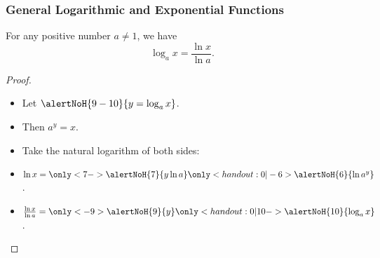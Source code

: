 \begin{frame}
\frametitle{General Logarithmic and Exponential Functions}
\begin{theorem}
For any positive number $a \neq 1$, we have
\[
\log_a x = \frac{\ln x}{\ln a} .
\]
\end{theorem}
\begin{proof}
\begin{itemize}
\item<2->  Let $\alertNoH{ 9-10}{y = \log_a x}$.
\item<3->  Then $a^y = x$.
\item<4->  Take the natural logarithm of both sides:
\item<5->  $\ln x=\only<7->{\alertNoH{ 7}{y \ln a}}\only<handout:0| -6>{\alertNoH{ 6}{\ln a^y}} $.
\item<8->  $\frac{\ln x}{\ln a}=\only<-9>{\alertNoH{ 9}{y}}\only<handout:0| 10->{\alertNoH{ 10}{\log_a x}} $.
\end{itemize}
\end{proof}
\end{frame}
